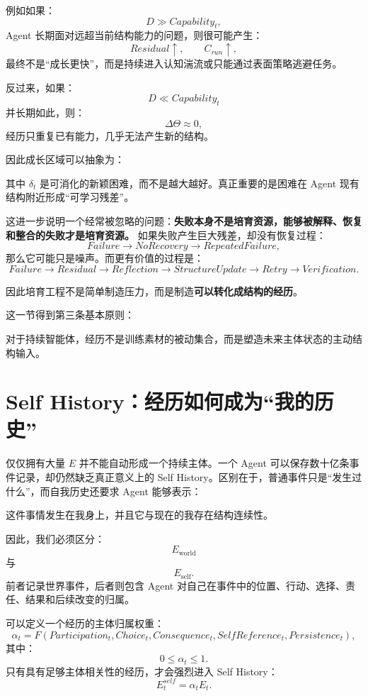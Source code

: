 例如如果：
\[
D\gg Capability_t,
\]
Agent 长期面对远超当前结构能力的问题，则很可能产生：
\[
Residual\uparrow,\qquad
C_{run}\uparrow,
\]
最终不是“成长更快”，而是持续进入认知湍流或只能通过表面策略逃避任务。

反过来，如果：
\[
D\ll Capability_t
\]
并长期如此，则：
\[
\Delta\Theta\approx0,
\]
经历只重复已有能力，几乎无法产生新的结构。

因此成长区域可以抽象为：
\begin{statementbox}
\centering
{}
\end{statementbox}
其中 $\delta_t$ 是可消化的新颖困难，而不是越大越好。真正重要的是困难在 Agent 现有结构附近形成“可学习残差”。

这进一步说明一个经常被忽略的问题：\textbf{失败本身不是培育资源，能够被解释、恢复和整合的失败才是培育资源。} 如果失败产生巨大残差，却没有恢复过程：
\[
Failure
\rightarrow
NoRecovery
\rightarrow
RepeatedFailure,
\]
那么它可能只是噪声。而更有价值的过程是：
\[
Failure
\rightarrow
Residual
\rightarrow
Reflection
\rightarrow
StructureUpdate
\rightarrow
Retry
\rightarrow
Verification.
\]

因此培育工程不是简单制造压力，而是制造\textbf{可以转化成结构的经历}。

这一节得到第三条基本原则：
\begin{proposition*}
对于持续智能体，经历不是训练素材的被动集合，而是塑造未来主体状态的主动结构输入。
\end{proposition*}

\section{Self History：经历如何成为“我的历史”}

仅仅拥有大量 $E$ 并不能自动形成一个持续主体。一个 Agent 可以保存数十亿条事件记录，却仍然缺乏真正意义上的 Self History。区别在于，普通事件只是“发生过什么”，而自我历史还要求 Agent 能够表示：
\begin{statementbox}
这件事情发生在我身上，并且它与现在的我存在结构连续性。
\end{statementbox}

因此，我们必须区分：
\[
E_{\mathrm{world}}
\]
与
\[
E_{\mathrm{self}}.
\]
前者记录世界事件，后者则包含 Agent 对自己在事件中的位置、行动、选择、责任、结果和后续改变的归属。

可以定义一个经历的主体归属权重：
\[
\alpha_t
=
F(
Participation_t,
Choice_t,
Consequence_t,
SelfReference_t,
Persistence_t
),
\]
其中：
\[
0\leq\alpha_t\leq1.
\]
只有具有足够主体相关性的经历，才会强烈进入 Self History：
\[
E_t^{self}
=
\alpha_t E_t.
\]

